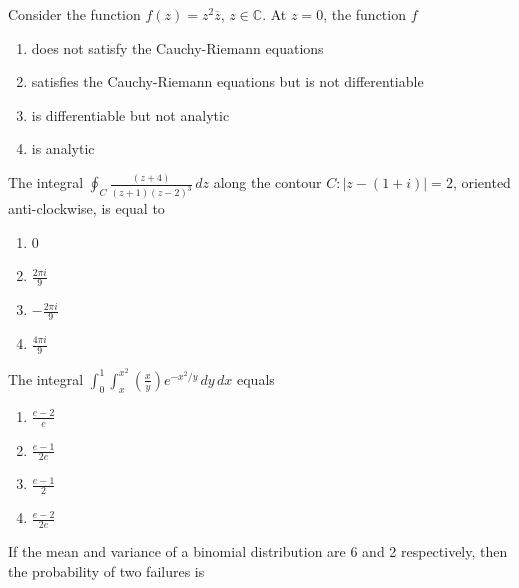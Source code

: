 \iffalse
\author{EE24BTECH11030}
\chapter{2013}
\section{xe}
\fi
    \item Consider the function \( f(z) = z^2 \overline{z} \), \( z \in \mathbb{C} \). At \( z = 0 \), the function \( f \)
    \begin{enumerate}
        \item does not satisfy the Cauchy-Riemann equations
        \item satisfies the Cauchy-Riemann equations but is not differentiable
        \item is differentiable but not analytic
        \item is analytic
    \end{enumerate}
    \bigskip
    \item The integral \( \oint_C \frac{(z+4)}{(z+1)(z-2)^3} \, dz \) along the contour \( C : |z - (1 + i)| = 2 \), oriented anti-clockwise, is equal to
    \begin{multicols}{4}
    \begin{enumerate}
        \item 0
        \item \( \frac{2 \pi i}{9} \)
        \item \( -\frac{2 \pi i}{9} \)
        \item \( \frac{4 \pi i}{9} \)
    \end{enumerate}
    \end{multicols}
\bigskip
    \item The integral \( \int_0^1 \int_{x}^{x^2} \left( \frac{x}{y} \right) e^{-x^2/y} \, dy \, dx \) equals
    \begin{multicols}{4}
    \begin{enumerate}
        \item \( \frac{e - 2}{e} \)
        \item \( \frac{e - 1}{2e} \)
        \item \( \frac{e - 1}{2} \)
        \item \( \frac{e - 2}{2e} \)
    \end{enumerate}
    \end{multicols}
\bigskip
    \item If the mean and variance of a binomial distribution are 6 and 2 respectively, then the probability of two failures is
